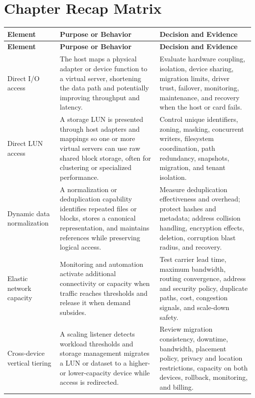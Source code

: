 \documentclass[11pt]{article}
\begin{document}
\section{Chapter Recap Matrix}
\begingroup\small\setlength{\tabcolsep}{4pt}
\begin{longtable}{@{}>{\RaggedRight\arraybackslash}p{}>{\RaggedRight\arraybackslash}p{}>{\RaggedRight\arraybackslash}p{}@{}}
\toprule\rowcolor{Navy}\color{white}\textbf{Element} & \color{white}\textbf{Purpose or Behavior} & \color{white}\textbf{Decision and Evidence}\\\midrule\endfirsthead
\toprule\rowcolor{Navy}\color{white}\textbf{Element} & \color{white}\textbf{Purpose or Behavior} & \color{white}\textbf{Decision and Evidence}\\\midrule\endhead
Direct I/O access & The host maps a physical adapter or device function to a virtual server, shortening the data path and potentially improving throughput and latency. & Evaluate hardware coupling, isolation, device sharing, migration limits, driver trust, failover, monitoring, maintenance, and recovery when the host or card fails. \\\midrule
Direct LUN access & A storage LUN is presented through host adapters and mappings so one or more virtual servers can use raw shared block storage, often for clustering or specialized performance. & Control unique identifiers, zoning, masking, concurrent writers, filesystem coordination, path redundancy, snapshots, migration, and tenant isolation. \\\midrule
Dynamic data normalization & A normalization or deduplication capability identifies repeated files or blocks, stores a canonical representation, and maintains references while preserving logical access. & Measure deduplication effectiveness and overhead; protect hashes and metadata; address collision handling, encryption effects, deletion, corruption blast radius, and recovery. \\\midrule
Elastic network capacity & Monitoring and automation activate additional connectivity or capacity when traffic reaches thresholds and release it when demand subsides. & Test carrier lead time, maximum bandwidth, routing convergence, address and security policy, duplicate paths, cost, congestion signals, and scale-down safety. \\\midrule
Cross-device vertical tiering & A scaling listener detects workload thresholds and storage management migrates a LUN or dataset to a higher- or lower-capacity device while access is redirected. & Review migration consistency, downtime, bandwidth, placement policy, privacy and location restrictions, capacity on both devices, rollback, monitoring, and billing. \\\midrule

\end{longtable}
\end{document}
